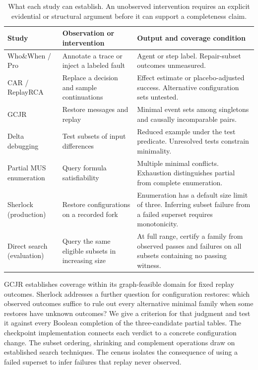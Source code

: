 \documentclass[11pt,letterpaper]{article}
\begin{document}
\begin{table}[htbp]\centering\small
\caption{What each study can establish. An unobserved intervention requires an explicit evidential or structural argument before it can support a completeness claim.}
\begin{tabular}{@{}p{.21\linewidth}p{.31\linewidth}p{.41\linewidth}@{}}\toprule
Study & Observation or intervention & Output and coverage condition\\\midrule
Who\&When / Pro & Annotate a trace or inject a labeled fault & Agent or step label. Repair-subset outcomes unmeasured.\\
CAR / ReplayRCA & Replace a decision and sample continuations & Effect estimate or placebo-adjusted success. Alternative configuration sets untested.\\
GCJR & Restore messages and replay & Minimal event sets among singletons and causally incomparable pairs.\\
Delta debugging & Test subsets of input differences & Reduced example under the test predicate. Unresolved tests constrain minimality.\\
Partial MUS enumeration & Query formula satisfiability & Multiple minimal conflicts. Exhaustion distinguishes partial from complete enumeration.\\
Sherlock (production) & Restore configurations on a recorded fork & Enumeration has a default size limit of three. Inferring subset failure from a failed superset requires monotonicity.\\
Direct search (evaluation) & Query the same eligible subsets in increasing size & At full range, certify a family from observed passes and failures on all subsets containing no passing witness.\\\bottomrule
\end{tabular}\end{table}

GCJR establishes coverage within its graph-feasible domain for fixed replay outcomes. Sherlock addresses a further question for configuration restores: which observed outcomes suffice to rule out every alternative minimal family when some restores have unknown outcomes? We give a criterion for that judgment and test it against every Boolean completion of the three-candidate partial tables. The checkpoint implementation connects each verdict to a concrete configuration change. The subset ordering, shrinking and complement operations draw on established search techniques. The census isolates the consequence of using a failed superset to infer failures that replay never observed.
\end{document}
